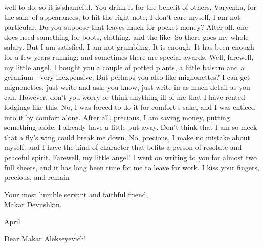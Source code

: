 well-to-do, so it is shameful. You drink it for the benefit of others, Varyenka, for the sake of appearances, to hit the right note; I don't care myself, I am not particular. Do you suppose that leaves much for pocket money? After all, one does need something for boots, clothing, and the like. So there goes my whole salary. But I am satisfied, I am not grumbling. It is enough. It has been enough for a few years running; and sometimes there are special awards. Well, farewell, my little angel. I bought you a couple of potted plants, a little balsam and a geranium---very inexpensive. But perhaps you also like mignonettes? I can get mignonettes, just write and ask; you know, just write in as much detail as you can. However, don't you worry or think anything ill of me that I have rented lodgings like this. No, I was forced to do it for comfort's sake, and I was enticed into it by comfort alone. After all, precious, I am saving money, putting something aside; I already have a little put away. Don't think that I am so meek that a fly's wing could break me down. No, precious, I make no mistake about myself, and I have the kind of character that befits a person of resolute and peaceful spirit. Farewell, my little angel! I went on writing to you for almost two full sheets, and it has long been time for me to leave for work. I kiss your fingers, precious, and remain

\begin{flushright}
Your most humble servant and faithful friend,\\
	Makar Devushkin.
\end{flushright}

\begin{flushright}
	April 
\end{flushright}

\noindent Dear Makar Alekseyevich!

